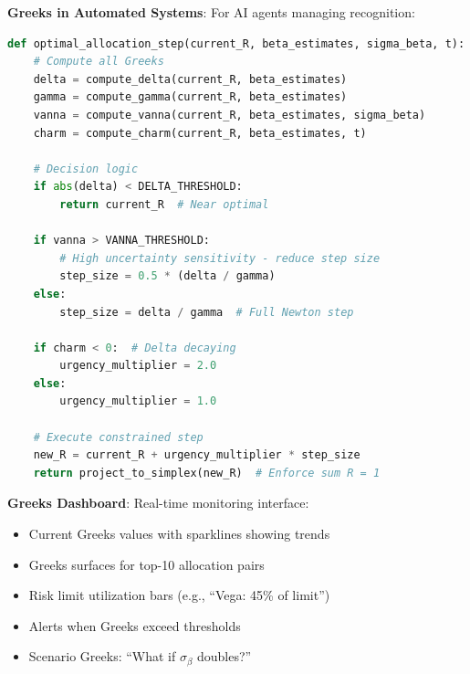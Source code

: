 \textbf{Greeks in Automated Systems}: For AI agents managing recognition:
\begin{lstlisting}[language=Python]
def optimal_allocation_step(current_R, beta_estimates, sigma_beta, t):
    # Compute all Greeks
    delta = compute_delta(current_R, beta_estimates)
    gamma = compute_gamma(current_R, beta_estimates)
    vanna = compute_vanna(current_R, beta_estimates, sigma_beta)
    charm = compute_charm(current_R, beta_estimates, t)
    
    # Decision logic
    if abs(delta) < DELTA_THRESHOLD:
        return current_R  # Near optimal
    
    if vanna > VANNA_THRESHOLD:
        # High uncertainty sensitivity - reduce step size
        step_size = 0.5 * (delta / gamma)
    else:
        step_size = delta / gamma  # Full Newton step
    
    if charm < 0:  # Delta decaying
        urgency_multiplier = 2.0
    else:
        urgency_multiplier = 1.0
    
    # Execute constrained step
    new_R = current_R + urgency_multiplier * step_size
    return project_to_simplex(new_R)  # Enforce sum R = 1
\end{lstlisting}

\textbf{Greeks Dashboard}: Real-time monitoring interface:
\begin{itemize}
\item Current Greeks values with sparklines showing trends
\item Greeks surfaces for top-10 allocation pairs
\item Risk limit utilization bars (e.g., ``Vega: 45\% of limit'')
\item Alerts when Greeks exceed thresholds
\item Scenario Greeks: ``What if $\sigma_\beta$ doubles?''
\end{itemize}
